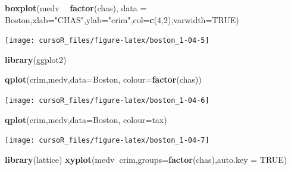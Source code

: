 \documentclass[]{book}
\newenvironment{Shaded}{\begin{snugshade}}{\end{snugshade}}
\newcommand{\KeywordTok}[1]{\textcolor[rgb]{0.13,0.29,0.53}{\textbf{#1}}}
\newcommand{\DataTypeTok}[1]{\textcolor[rgb]{0.13,0.29,0.53}{#1}}
\newcommand{\DecValTok}[1]{\textcolor[rgb]{0.00,0.00,0.81}{#1}}
\newcommand{\StringTok}[1]{\textcolor[rgb]{0.31,0.60,0.02}{#1}}
\newcommand{\OtherTok}[1]{\textcolor[rgb]{0.56,0.35,0.01}{#1}}
\newcommand{\OperatorTok}[1]{\textcolor[rgb]{0.81,0.36,0.00}{\textbf{#1}}}
\newcommand{\NormalTok}[1]{#1}
\begin{document}
\begin{Shaded}
\begin{Highlighting}[]
\KeywordTok{boxplot}\NormalTok{(medv }\OperatorTok{~}\StringTok{ }\KeywordTok{factor}\NormalTok{(chas), }\DataTypeTok{data =}\NormalTok{ Boston,}\DataTypeTok{xlab=}\StringTok{"CHAS"}\NormalTok{,}\DataTypeTok{ylab=}\StringTok{"crim"}\NormalTok{,}\DataTypeTok{col=}\KeywordTok{c}\NormalTok{(}\DecValTok{4}\NormalTok{,}\DecValTok{2}\NormalTok{),}\DataTypeTok{varwidth=}\OtherTok{TRUE}\NormalTok{)}
\end{Highlighting}
\end{Shaded}

\begin{center}\texttt{[image: cursoR\_files/figure-latex/boston\_1-04-5]} \end{center}

\begin{Shaded}
\begin{Highlighting}[]
\KeywordTok{library}\NormalTok{(ggplot2)}

\KeywordTok{qplot}\NormalTok{(crim,medv,}\DataTypeTok{data=}\NormalTok{Boston, }\DataTypeTok{colour=}\KeywordTok{factor}\NormalTok{(chas))}
\end{Highlighting}
\end{Shaded}

\begin{center}\texttt{[image: cursoR\_files/figure-latex/boston\_1-04-6]} \end{center}

\begin{Shaded}
\begin{Highlighting}[]
\KeywordTok{qplot}\NormalTok{(crim,medv,}\DataTypeTok{data=}\NormalTok{Boston, }\DataTypeTok{colour=}\NormalTok{tax)}
\end{Highlighting}
\end{Shaded}

\begin{center}\texttt{[image: cursoR\_files/figure-latex/boston\_1-04-7]} \end{center}

\begin{Shaded}
\begin{Highlighting}[]
\KeywordTok{library}\NormalTok{(lattice)}
\KeywordTok{xyplot}\NormalTok{(medv}\OperatorTok{~}\NormalTok{crim,}\DataTypeTok{groups=}\KeywordTok{factor}\NormalTok{(chas),}\DataTypeTok{auto.key =} \OtherTok{TRUE}\NormalTok{)}
\end{Highlighting}
\end{Shaded}
\end{document}
